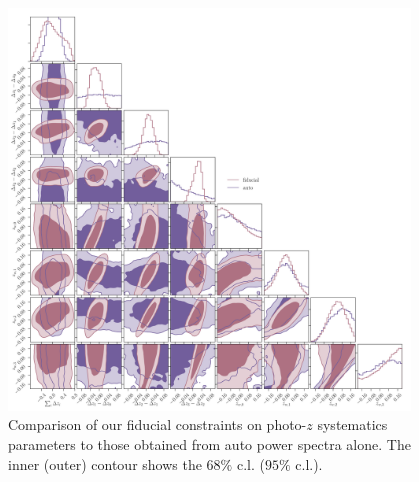 \documentclass[a4paper,11pt]{article}
\begin{document}
 \begin{figure}
\begin{center}
\includegraphics[width=0.95\textwidth]{figures/contours-pz-syst_mPk=HOD_fix=alpha-fc-sigmaM_HOD=zevol_fit=pz-shifts+prior=0p2-pz-widths+prior=0p2_cosmo=const_cov=G+NG+SSC-LINBIAS_HOD-param=zfid_clfit=HOD-zevol_fit=auto+cross-vs-fit=auto.pdf}
\caption{Comparison of our fiducial constraints on photo-$z$ systematics parameters to those obtained from auto power spectra alone. The inner (outer) contour shows the $68 \%$ c.l. ($95 \%$ c.l.).}
\label{fig:constraints-pz-syst-auto+cross-vs-auto}
\end{center}
\end{figure}
\end{document}
